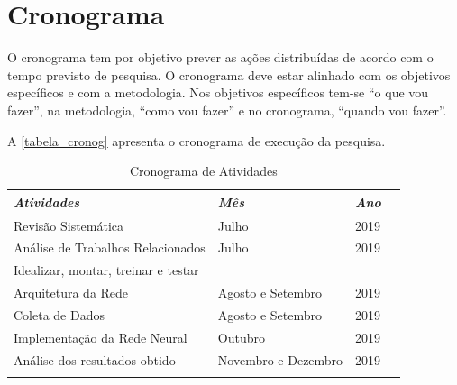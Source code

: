 \documentclass[
	12pt,				%
	openright,			%
	oneside,
	a4paper,			%
	english,			%
	french,				%
	spanish,			%
	brazil,				%
	]{abntex2}
\begin{document}


\chapter{Cronograma}

O cronograma tem por objetivo prever as ações distribuídas de acordo com o tempo previsto de pesquisa. O cronograma deve estar alinhado com os objetivos específicos e com a metodologia. Nos objetivos específicos tem-se “o que vou fazer”, na metodologia, “como vou fazer” e no cronograma, “quando vou fazer”.

A \autoref{tabela_cronog} apresenta o cronograma de execução da pesquisa. 

\begin{table}[!htb]
\centering
\caption{Cronograma de Atividades}
\label{tabela_cronog}
\begin{tabular}{@{}llll@{}}
\toprule
\textit{Atividades}                  & \textit{Mês}       & \textit{Ano}   \\ \midrule
Revisão Sistemática                  & Julho              & 2019      \\
Análise de Trabalhos Relacionados    & Julho              & 2019      \\
Idealizar, montar, treinar e testar                                  \\
Arquitetura da Rede                  & Agosto e Setembro  & 2019      \\
Coleta de Dados                      & Agosto e Setembro  & 2019      \\
Implementação da Rede Neural         & Outubro            & 2019      \\
Análise dos resultados obtido        & Novembro e Dezembro& 2019      \\
                                     &                    &           \\ \bottomrule
\end{tabular}
\end{table}







\end{document}
